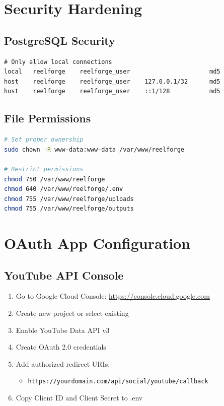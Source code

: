 \section{Security Hardening}

\subsection{PostgreSQL Security}

\begin{lstlisting}[caption=/etc/postgresql/14/main/pg_hba.conf]
# Only allow local connections
local   reelforge    reelforge_user                      md5
host    reelforge    reelforge_user    127.0.0.1/32      md5
host    reelforge    reelforge_user    ::1/128           md5
\end{lstlisting}

\subsection{File Permissions}

\begin{lstlisting}[language=bash]
# Set proper ownership
sudo chown -R www-data:www-data /var/www/reelforge

# Restrict permissions
chmod 750 /var/www/reelforge
chmod 640 /var/www/reelforge/.env
chmod 755 /var/www/reelforge/uploads
chmod 755 /var/www/reelforge/outputs
\end{lstlisting}

\section{OAuth App Configuration}

\subsection{YouTube API Console}

\begin{enumerate}
    \item Go to Google Cloud Console: \url{https://console.cloud.google.com}
    \item Create new project or select existing
    \item Enable YouTube Data API v3
    \item Create OAuth 2.0 credentials
    \item Add authorized redirect URIs:
    \begin{itemize}
        \item \texttt{https://yourdomain.com/api/social/youtube/callback}
    \end{itemize}
    \item Copy Client ID and Client Secret to .env
\end{enumerate}

